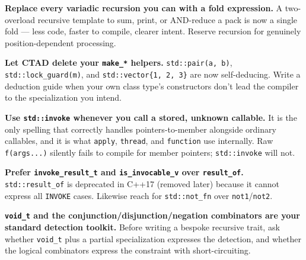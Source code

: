 \textbf{Replace every variadic recursion you can with a fold expression.} A two-overload recursive template to sum, print, or AND-reduce a pack is now a single fold --- less code, faster to compile, clearer intent. Reserve recursion for genuinely position-dependent processing.

\textbf{Let CTAD delete your \texttt{make\_*} helpers.} \texttt{std::pair(a, b)}, \texttt{std::lock\_guard(m)}, and \texttt{std::vector\{1, 2, 3\}} are now self-deducing. Write a deduction guide when your own class type's constructors don't lead the compiler to the specialization you intend.

\textbf{Use \texttt{std::invoke} whenever you call a stored, unknown callable.} It is the only spelling that correctly handles pointers-to-member alongside ordinary callables, and it is what \texttt{apply}, \texttt{thread}, and \texttt{function} use internally. Raw \texttt{f(args...)} silently fails to compile for member pointers; \texttt{std::invoke} will not.

\textbf{Prefer \texttt{invoke\_result\_t} and \texttt{is\_invocable\_v} over \texttt{result\_of}.} \texttt{std::result\_of} is deprecated in C++17 (removed later) because it cannot express all \texttt{INVOKE} cases. Likewise reach for \texttt{std::not\_fn} over \texttt{not1}/\texttt{not2}.

\textbf{\texttt{void\_t} and the conjunction/disjunction/negation combinators are your standard detection toolkit.} Before writing a bespoke recursive trait, ask whether \texttt{void\_t} plus a partial specialization expresses the detection, and whether the logical combinators express the constraint with short-circuiting.
